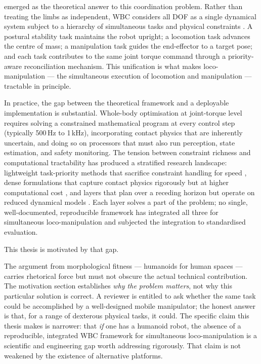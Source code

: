 \WBC{} emerged as the theoretical answer to this coordination problem.
Rather than treating the limbs as independent, WBC considers all DOF as
a single dynamical system subject to a hierarchy of simultaneous tasks
and physical constraints \cite{Khatib1987,Sentis2005}. A postural
stability task maintains the robot upright; a locomotion task advances
the centre of mass; a manipulation task guides the end-effector to a
target pose; and each task contributes to the same joint torque command
through a priority-aware reconciliation mechanism. This unification
is what makes loco-manipulation — the simultaneous execution of
locomotion and manipulation — tractable in principle.

In practice, the gap between the theoretical framework and a deployable
implementation is substantial. Whole-body optimisation at joint-torque
level requires solving a constrained mathematical program at every
control step (typically 500\,Hz to 1\,kHz), incorporating contact
physics that are inherently uncertain, and doing so on processors that
must also run perception, state estimation, and safety monitoring. The
tension between constraint richness and computational tractability has
produced a stratified research landscape: lightweight task-priority
methods that sacrifice constraint handling for speed \cite{Sentis2005},
dense \QP{} formulations that capture contact physics rigorously but at
higher computational cost \cite{Wensing2013,Koolen2016}, and \MPC{}
layers that plan over a receding horizon but operate on reduced
dynamical models \cite{Orin2013}. Each layer solves a part of the
problem; no single, well-documented, reproducible framework has
integrated all three for simultaneous loco-manipulation and subjected
the integration to standardised evaluation.

This thesis is motivated by that gap.

\begin{criticalinsight}
  The argument from morphological fitness — humanoids for human spaces —
  carries rhetorical force but must not obscure the actual technical
  contribution. The motivation section establishes \emph{why the problem
  matters}, not why this particular solution is correct. A reviewer is
  entitled to ask whether the same task could be accomplished by a
  well-designed mobile manipulator; the honest answer is that, for a
  range of dexterous physical tasks, it could. The specific claim this
  thesis makes is narrower: that \emph{if} one has a humanoid robot, the
  absence of a reproducible, integrated WBC framework for simultaneous
  loco-manipulation is a scientific and engineering gap worth addressing
  rigorously. That claim is not weakened by the existence of alternative
  platforms.
\end{criticalinsight}


